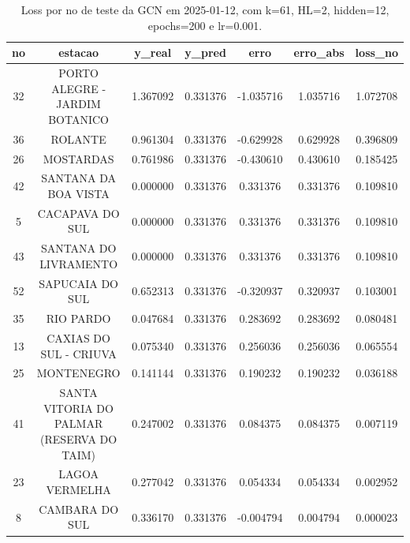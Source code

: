 \begin{table}[h]
\centering
\caption{Loss por no de teste da GCN em 2025-01-12, com k=61, HL=2, hidden=12, epochs=200 e lr=0.001.}
\label{tab:gcn_loss_k61_hl2_h12_e200_d20250112}
\begin{tabular}{ccccccc}
\toprule
no & estacao & y\_real & y\_pred & erro & erro\_abs & loss\_no \\
\midrule
32 & PORTO ALEGRE - JARDIM BOTANICO & 1.367092 & 0.331376 & -1.035716 & 1.035716 & 1.072708 \\
36 & ROLANTE & 0.961304 & 0.331376 & -0.629928 & 0.629928 & 0.396809 \\
26 & MOSTARDAS & 0.761986 & 0.331376 & -0.430610 & 0.430610 & 0.185425 \\
42 & SANTANA DA BOA VISTA & 0.000000 & 0.331376 & 0.331376 & 0.331376 & 0.109810 \\
5 & CACAPAVA DO SUL & 0.000000 & 0.331376 & 0.331376 & 0.331376 & 0.109810 \\
43 & SANTANA DO LIVRAMENTO & 0.000000 & 0.331376 & 0.331376 & 0.331376 & 0.109810 \\
52 & SAPUCAIA DO SUL & 0.652313 & 0.331376 & -0.320937 & 0.320937 & 0.103001 \\
35 & RIO PARDO & 0.047684 & 0.331376 & 0.283692 & 0.283692 & 0.080481 \\
13 & CAXIAS DO SUL - CRIUVA & 0.075340 & 0.331376 & 0.256036 & 0.256036 & 0.065554 \\
25 & MONTENEGRO & 0.141144 & 0.331376 & 0.190232 & 0.190232 & 0.036188 \\
41 & SANTA VITORIA DO PALMAR (RESERVA DO TAIM) & 0.247002 & 0.331376 & 0.084375 & 0.084375 & 0.007119 \\
23 & LAGOA VERMELHA & 0.277042 & 0.331376 & 0.054334 & 0.054334 & 0.002952 \\
8 & CAMBARA DO SUL & 0.336170 & 0.331376 & -0.004794 & 0.004794 & 0.000023 \\
\bottomrule
\end{tabular}
\end{table}
